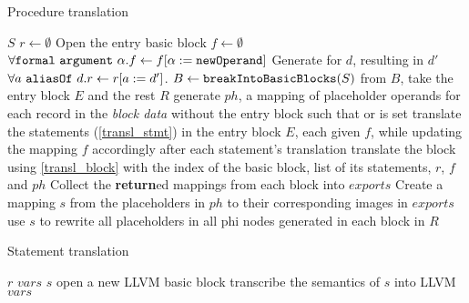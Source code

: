 \begin{algorithm}
    \caption{Procedure translation}
    \label{trans_proc}
    \begin{algorithmic}[1]
        \Require $S$ 
        \State $r \gets \emptyset$ 
        \State Open the entry basic block
        \State $f \gets \emptyset$ 
        \State $\forall \mathtt{formal\ argument}\ \alpha . f \gets f [ \alpha := \mathtt{newOperand}]$
            \State Generate  for $d$, resulting in $d'$
            \State $\forall  a\ \mathtt{aliasOf}\ d .  r \gets r[a := d']$. 
        \EndFor
        \State $B \gets \mathtt{breakIntoBasicBlocks} (S)$ 
        \State from $B$, take the entry block $E$ and the rest $R$
        \State generate $ph$, a mapping of placeholder operands for each record in the \emph{block data} without the entry block such that  or  is set
        \State translate the statements (\cref{transl_stmt}) in the entry block $E$, each given $f$, while updating the mapping $f$ accordingly after each statement's translation
            \State translate the block using \cref{transl_block} with the index of the basic block, list of its statements, $r$, $f$ and $ph$
        \EndFor
        \State Collect the \textbf{return}ed mappings from each block into $exports$
        \State Create a mapping $s$ from the placeholders in $ph$ to their corresponding images in $exports$
        \State use $s$ to rewrite all placeholders in all phi nodes generated in each block in $R$
    \end{algorithmic}
\end{algorithm}

\begin{algorithm}
    \caption{Statement translation}
    \label{transl_stmt}
    \begin{algorithmic}[1]
        \Require $r$ 
        \Require $vars$ 
        \Require $s$ 
            \State open a new LLVM basic block
        \Else
            \State transcribe the semantics of $s$ into LLVM
            \State {}
            \State {}
        \EndIf
        \State \Return $vars$
    \end{algorithmic}
\end{algorithm}

